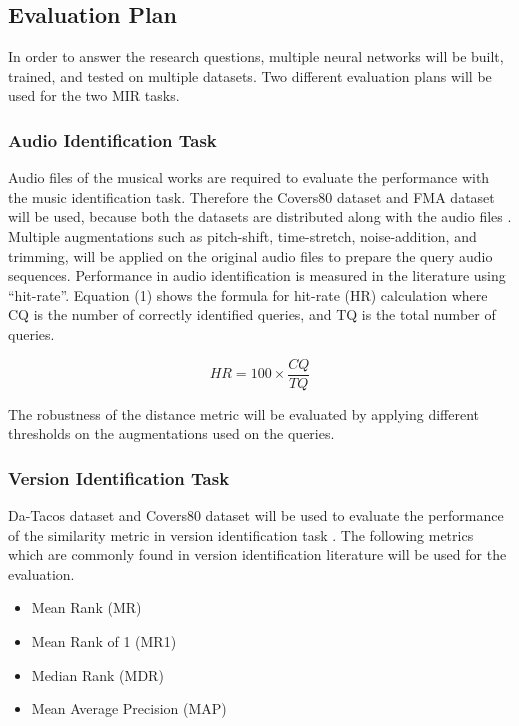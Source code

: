 \documentclass[../main.tex]{subfiles}
\begin{document}
\subsection{Evaluation Plan}
In order to answer the research questions, multiple neural networks will be built, trained, and tested on multiple datasets. Two different evaluation plans will be used for the two \gls{MIR} tasks.

\subsubsection{Audio Identification Task}
Audio files of the musical works are required to evaluate the performance with the music identification task. Therefore the Covers80 dataset and FMA dataset will be used, because both the datasets are distributed along with the audio files \cite{Covers80CoverSong,defferrardFMADatasetMusic2017}. Multiple augmentations such as pitch-shift, time-stretch, noise-addition, and trimming, will be applied on the original audio files to prepare the query audio sequences. Performance in audio identification is measured in the literature using “hit-rate”. Equation (1) shows the formula for hit-rate (HR) calculation where CQ is the number of correctly identified queries, and TQ is the total number of queries.

\begin{equation}
    HR = 100 \times \frac{CQ}{TQ}
\end{equation}

\par
The robustness of the distance metric will be evaluated by applying different thresholds on the augmentations used on the queries.

\newpage
\subsubsection{Version Identification Task}
Da-Tacos dataset and Covers80 dataset will be used to evaluate the performance of the similarity metric in version identification task \cite{yesilerDaTACOSDatasetCover2019,Covers80CoverSong}. The following metrics which are commonly found in version identification literature will be used for the evaluation.
\begin{itemize}
    \item Mean Rank (MR)
    \item Mean Rank of 1 (MR1)
    \item Median Rank (MDR)
    \item Mean Average Precision (MAP)
\end{itemize}
\end{document}
